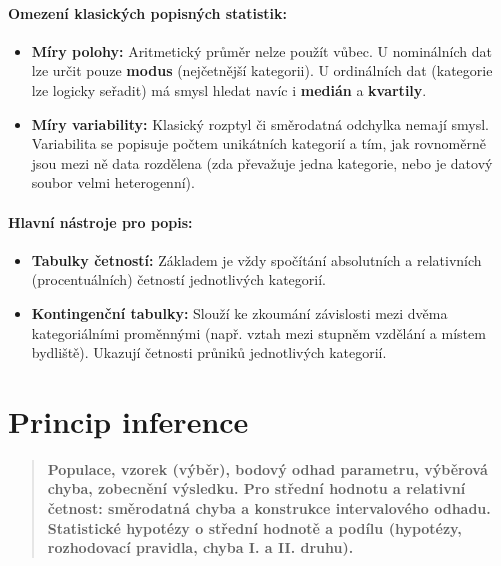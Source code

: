 \paragraph*{Omezení klasických popisných statistik:}
\begin{itemize}
    \item \textbf{Míry polohy:} Aritmetický průměr nelze použít vůbec. U nominálních dat lze určit pouze \textbf{modus} (nejčetnější kategorii). U ordinálních dat (kategorie lze logicky seřadit) má smysl hledat navíc i \textbf{medián} a \textbf{kvartily}.
    \item \textbf{Míry variability:} Klasický rozptyl či směrodatná odchylka nemají smysl. Variabilita se popisuje počtem unikátních kategorií a tím, jak rovnoměrně jsou mezi ně data rozdělena (zda převažuje jedna kategorie, nebo je datový soubor velmi heterogenní).
\end{itemize}

\paragraph*{Hlavní nástroje pro popis:}
\begin{itemize}
    \item \textbf{Tabulky četností:} Základem je vždy spočítání absolutních a relativních (procentuálních) četností jednotlivých kategorií.
    \item \textbf{Kontingenční tabulky:} Slouží ke zkoumání závislosti mezi dvěma kategoriálními proměnnými (např. vztah mezi stupněm vzdělání a místem bydliště). Ukazují četnosti průniků jednotlivých kategorií.
\end{itemize}

\section{Princip inference}
\begin{quote}
    \textbf{Populace, vzorek (výběr), bodový odhad parametru, výběrová chyba, zobecnění výsledku. Pro střední hodnotu a relativní četnost: směrodatná chyba a konstrukce intervalového odhadu. Statistické hypotézy o střední hodnotě a podílu (hypotézy, rozhodovací pravidla, chyba I. a II. druhu).}
\end{quote}

